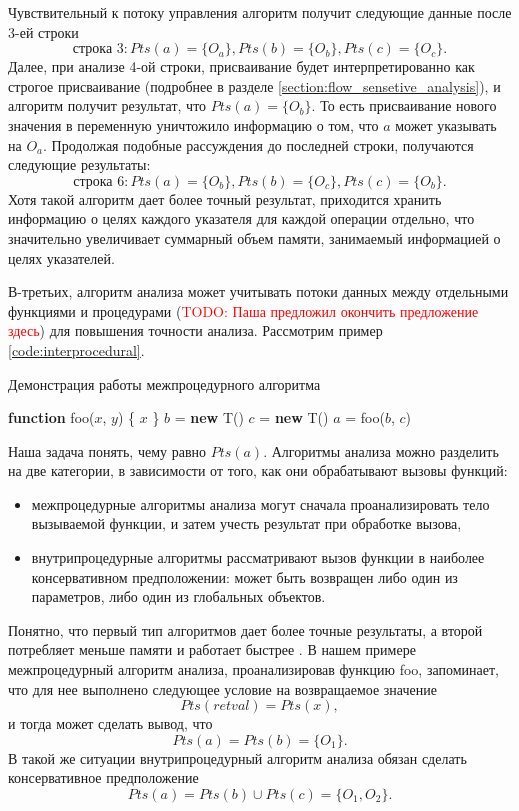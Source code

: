 \documentclass[14pt,titlepage]{extarticle}
\newcommand{\NEW}{\textbf{new }}
\newcommand{\FUNCTION}{\textbf{function }}
\newcommand{\todo}[1]{\textcolor{red}{\eng{TODO}: #1}}
\newcommand{\eng}[1]{{\English#1}}
\begin{document}
      Чувствительный к потоку управления алгоритм получит следующие данные
      после 3-ей строки
      \[\textrm{строка 3}:
          Pts(a) = \{O_a\}, Pts(b) = \{O_b\}, Pts(c) = \{O_c\}.\]
      Далее, при анализе 4-ой строки, присваивание будет интерпретированно как
      строгое присваивание (подробнее в разделе
      \ref{section:flow_sensetive_analysis}), и алгоритм получит
      результат, что $Pts(a) = \{O_b\}$. То есть присваивание нового значения
      в переменную уничтожило информацию о том, что $a$ может указывать на $O_a$.
      Продолжая подобные рассуждения до последней строки, получаются следующие
      результаты:
      \[\textrm{строка 6}:
          Pts(a) = \{O_b\}, Pts(b) = \{O_c\}, Pts(c) = \{O_b\}.\]
      Хотя такой алгоритм дает более точный результат, приходится хранить
      информацию о целях каждого указателя для каждой операции отдельно,
      что значительно увеличивает суммарный объем памяти, занимаемый
      информацией о целях указателей.

      В-третьих, алгоритм анализа может учитывать потоки данных между отдельными
      функциями и процедурами
      (\todo{Паша предложил окончить предложение здесь})
      для повышения точности анализа.
      Рассмотрим пример \ref{code:interprocedural}.
      \begin{algorithm}
        \caption{Демонстрация работы межпроцедурного алгоритма}
        \label{code:interprocedural}
        \begin{algorithmic}[1]
          \STATE \FUNCTION foo($x$, $y$) \{
          \RETURN $x$
          \STATE \}
          \STATE
          \STATE $b$ = \NEW T()
          \STATE $c$ = \NEW T()
          \STATE $a$ = foo($b$, $c$)
        \end{algorithmic}
      \end{algorithm}

      Наша задача понять, чему равно $Pts(a)$.
      Алгоритмы анализа можно разделить на две категории, в зависимости от
      того, как они обрабатывают вызовы функций:
      \begin{itemize}
        \item межпроцедурные алгоритмы анализа могут сначала проанализировать
              тело вызываемой функции, и затем учесть результат при обработке
              вызова,
        \item внутрипроцедурные алгоритмы рассматривают вызов функции в
              наиболее консервативном предположении: может быть возвращен либо
              один из параметров, либо один из глобальных объектов.
      \end{itemize}
      Понятно, что первый тип алгоритмов дает более точные результаты,
      а второй потребляет меньше памяти и работает быстрее
      \cite[с.~117]{andersen}.
      В нашем примере межпроцедурный алгоритм анализа, проанализировав функцию
      foo, запоминает, что для нее выполнено следующее условие на возвращаемое
      значение
      \[Pts(retval) = Pts(x),\]
      и тогда может сделать вывод, что \[Pts(a) = Pts(b) = \{O_1\}.\]
      В такой же ситуации внутрипроцедурный алгоритм анализа обязан сделать
      консервативное предположение
      \[Pts(a) = Pts(b) \cup Pts(c) = \{O_1, O_2\}.\]
\end{document}
